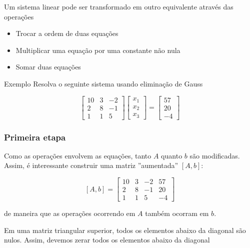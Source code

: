 \begin{frame}
    Um sistema linear pode ser transformado em outro equivalente através das operações
    \begin{itemize}
        \item Trocar a ordem de duas equações
        \item Multiplicar uma equação por uma constante não nula
        \item Somar duas equações
    \end{itemize}

    \begin{block}
        {Exemplo}
        Resolva o seguinte sistema usando eliminação de Gauss

        \[
            \begin{bmatrix}
                10 & 3 & -2 \\ 2 & 8 & -1 \\ 1 & 1 & 5
            \end{bmatrix}
            \begin{bmatrix}
                x_1 \\ x_2 \\ x_3
            \end{bmatrix}
            =
            \begin{bmatrix}
                57 \\ 20 \\ -4
            \end{bmatrix}
        \]

    \end{block}
\end{frame}

\begin{frame}
    \frametitle{Primeira etapa}
    Como as operações envolvem as equações, tanto \(A\) quanto \(b\) são modificadas. Assim, é interessante construir uma matriz ''aumentada'' \([A,b]\):

    \[
        [A,b] =
        \left[
            \begin{array}{ccc|c}
                10 & 3 & -2 & 57 \\ 2 & 8 & -1 & 20 \\ 1 & 1 & 5 & -4
            \end{array}
        \right]
    \]

    de maneira que as operações ocorrendo em \(A\) também ocorram em \(b\). 

    \begin{block}
        {}
        Em uma matriz triangular superior, todos os elementos abaixo da diagonal são nulos. Assim, devemos zerar todos os elementos abaixo da diagonal
    \end{block}

\end{frame}

